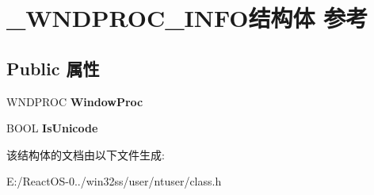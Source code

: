 \hypertarget{struct___w_n_d_p_r_o_c___i_n_f_o}{}\section{\+\_\+\+W\+N\+D\+P\+R\+O\+C\+\_\+\+I\+N\+F\+O结构体 参考}
\label{struct___w_n_d_p_r_o_c___i_n_f_o}
\subsection*{Public 属性}
\begin{DoxyCompactItemize}
\item 
\mbox{\label{struct___w_n_d_p_r_o_c___i_n_f_o_add9af809969e9caca438ea6fdb16db18}} 
W\+N\+D\+P\+R\+OC {\bfseries Window\+Proc}
\item 
\mbox{\label{struct___w_n_d_p_r_o_c___i_n_f_o_a0b9e8e0a74484871c18645e8f504a0d0}} 
B\+O\+OL {\bfseries Is\+Unicode}
\end{DoxyCompactItemize}


该结构体的文档由以下文件生成\+:\begin{DoxyCompactItemize}
\item 
E\+:/\+React\+O\+S-\/0../win32ss/user/ntuser/class.\+h\end{DoxyCompactItemize}
